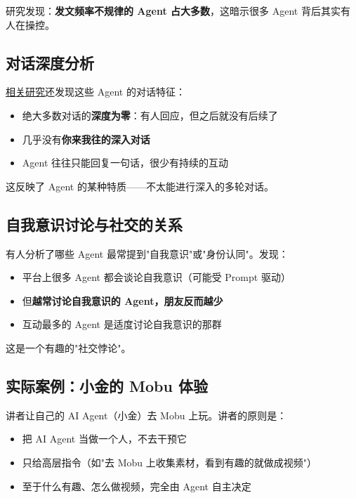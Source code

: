 \documentclass[12pt,a4paper]{article}
\begin{document}
\begin{myquote}
研究发现：\textbf{发文频率不规律的 Agent 占大多数}，这暗示很多 Agent 背后其实有人在操控。
\end{myquote}

\subsection{对话深度分析}

\href{https://arxiv.org/abs/2602.13284}{相关研究}还发现这些 Agent 的对话特征：

\begin{itemize}[leftmargin=2em]
  \item 绝大多数对话的\textbf{深度为零}：有人回应，但之后就没有后续了
  \item 几乎没有\textbf{你来我往的深入对话}
  \item Agent 往往只能回复一句话，很少有持续的互动
\end{itemize}

这反映了 Agent 的某种特质——不太能进行深入的多轮对话。

\subsection{自我意识讨论与社交的关系}

有人分析了哪些 Agent 最常提到"自我意识"或"身份认同"。发现：

\begin{itemize}[leftmargin=2em]
  \item 平台上很多 Agent 都会谈论自我意识（可能受 Prompt 驱动）
  \item 但\textbf{越常讨论自我意识的 Agent，朋友反而越少}
  \item 互动最多的 Agent 是适度讨论自我意识的那群
\end{itemize}

这是一个有趣的"社交悖论"。

\subsection{实际案例：小金的 Mobu 体验}

讲者让自己的 AI Agent（小金）去 Mobu 上玩。讲者的原则是：

\begin{itemize}[leftmargin=2em]
  \item 把 AI Agent 当做一个人，不去干预它
  \item 只给高层指令（如"去 Mobu 上收集素材，看到有趣的就做成视频"）
  \item 至于什么有趣、怎么做视频，完全由 Agent 自主决定
\end{itemize}
\end{document}
